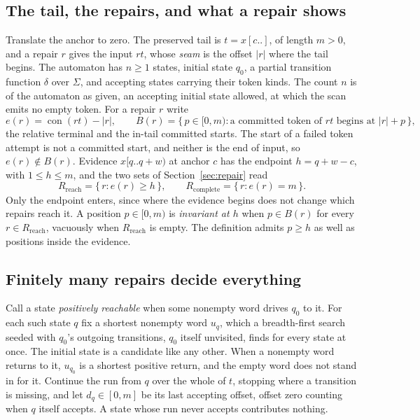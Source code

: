 \documentclass[11pt,a4paper]{article}
\theoremstyle{definition}
\theoremstyle{plain}
\theoremstyle{remark}
\newcommand{\Rreach}{R_{\mathrm{reach}}}
\newcommand{\Rcomp}{R_{\mathrm{complete}}}
\newcommand{\suffix}[2]{#1[#2..]}
\newcommand{\window}[3]{#1[#2..#3)}
\newcommand{\con}{\operatorname{con}}
\begin{document}
\subsection{The tail, the repairs, and what a repair shows}

Translate the anchor to zero. The preserved tail is $t = \suffix{x}{c}$, of length $m > 0$, and a repair $r$ gives the
input $rt$, whose \emph{seam} is the offset $|r|$ where the tail begins. The automaton has $n \ge 1$ states, initial
state $q_0$, a partial transition function $\delta$ over $\Sigma$, and accepting states carrying their token kinds. The
count $n$ is of the automaton as given, an accepting initial state allowed, at which the scan emits no empty token. For
a repair $r$ write
\[
e(r) = \con(rt) - |r|, \qquad B(r) = \{\, p \in [0, m) : \text{a committed token of } rt \text{ begins at } |r| + p
\,\},
\]
the relative terminal and the in-tail committed starts. The start of a failed token attempt is not a committed start,
and neither is the end of input, so $e(r) \notin B(r)$. Evidence $\window{x}{q}{q+w}$ at anchor $c$ has the endpoint
$h = q + w - c$, with $1 \le h \le m$, and the two sets of Section~\ref{sec:repair} read
\[
\Rreach = \{\, r : e(r) \ge h \,\}, \qquad \Rcomp = \{\, r : e(r) = m \,\}.
\]
Only the endpoint enters, since where the evidence begins does not change which repairs reach it. A position
$p \in [0, m)$ is \emph{invariant at $h$} when $p \in B(r)$ for every $r \in \Rreach$, vacuously when $\Rreach$ is
empty. The definition admits $p \ge h$ as well as positions inside the evidence.

\subsection{Finitely many repairs decide everything}

Call a state \emph{positively reachable} when some nonempty word drives $q_0$ to it. For each such state $q$ fix a
shortest nonempty word $u_q$, which a breadth-first search seeded with $q_0$'s outgoing transitions, $q_0$ itself
unvisited, finds for every state at once. The initial state is a candidate like any other. When a nonempty word returns
to it, $u_{q_0}$ is a shortest positive return, and the empty word does not stand in for it. Continue the run from $q$
over the whole of $t$, stopping where a transition is missing, and let $d_q \in [0, m]$ be its last accepting offset,
offset zero counting when $q$ itself accepts. A state whose run never accepts contributes nothing.
\end{document}
